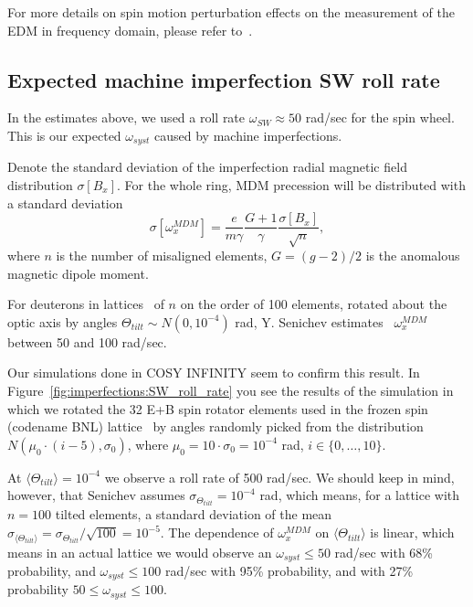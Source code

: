 \documentclass[a4paper]{jacow}
\newcommand{\w}{\omega}
\newcommand{\avg}[1]{\langle{#1}\rangle}
\newcommand{\wsw}{\w_{SW}}
\begin{document}
For more details on spin motion perturbation effects on the measurement of the EDM in frequency domain, 
please refer to~\cite{Aksentev:IPAC19:SMP}.

\subsection{Expected machine imperfection SW roll rate}
In the estimates above, we used a roll rate $\wsw\approx 50$ rad/sec for the spin wheel. This is
our expected $\w_{syst}$ caused by machine imperfections.

Denote the standard deviation of the imperfection radial magnetic field distribution $\sigma[B_x]$.
For the whole ring, MDM precession will be distributed with a standard deviation~\cite{Senichev:FDM}
\[
\sigma[\w_x^{MDM}] = \frac{e}{m\gamma}\frac{G+1}{\gamma}\frac{\sigma[B_x]}{\sqrt{n}},
\]
where $n$ is the number of misaligned elements, $G=(g-2)/2$ is the anomalous magnetic dipole moment.

For deuterons in lattices~\cite{Senichev:Lattices} of $n$ on the order of 100 elements, rotated about the
optic axis by angles $\Theta_{tilt}\sim N(0, 10^{-4})$ rad, Y. Senichev estimates~\cite{Senichev:FDM}
$\w_x^{MDM}$ between 50 and 100 rad/sec. 

Our simulations done in COSY INFINITY seem to confirm this result. In 
Figure~\ref{fig:imperfections:SW_roll_rate} you see the results of the simulation 
in which we rotated the 32 E+B spin rotator elements used in the frozen spin 
(codename BNL) lattice~\cite{Senichev:Lattices} by angles randomly picked from
the distribution $N(\mu_0\cdot(i-5), \sigma_0)$, where $\mu_0 = 10\cdot\sigma_0 = 10^{-4}$ rad,
$i\in\lbrace0,\dots, 10\rbrace$.

At $\avg{\Theta_{tilt}} = 10^{-4}$ we observe a roll rate of 500 rad/sec. We should keep in mind,  however, that 
Senichev assumes $\sigma_{\Theta_{tilt}} = 10^{-4}$ rad, which means, for a lattice with $n=100$ tilted elements,
a standard deviation of the mean $\sigma_{\avg{\Theta_{tilt}}} = {\sigma_{\Theta_{tilt}}}/{\sqrt{100}} = 10^{-5}$. The dependence of $\w_x^{MDM}$ on $\avg{\Theta_{tilt}}$
is linear, which means in an actual lattice we would observe an $\w_{syst} \le 50$ rad/sec with 68\% probability,
and $\w_{syst} \le 100$ rad/sec with 95\% probability, and with 27\% probability $50 \le\w_{syst}\le 100$.
\end{document}
